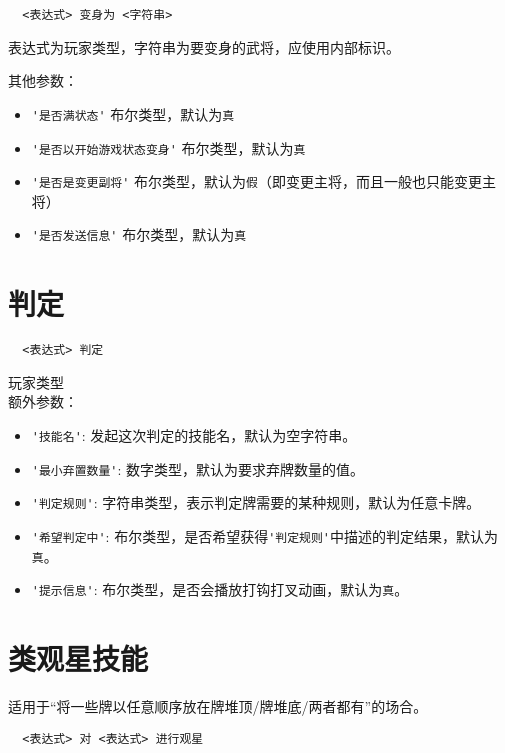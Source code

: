 \begin{verbatim}
  <表达式> 变身为 <字符串>
\end{verbatim}

表达式为玩家类型，字符串为要变身的武将，应使用内部标识。

其他参数：

\begin{itemize}
  \item \verb|'是否满状态'| 布尔类型，默认为\verb|真|
  \item \verb|'是否以开始游戏状态变身'| 布尔类型，默认为\verb|真|
  \item \verb|'是否是变更副将'| 布尔类型，默认为\verb|假|（即变更主将，而且一般也只能变更主将）
  \item \verb|'是否发送信息'| 布尔类型，默认为\verb|真|
\end{itemize}

\section{判定}

\begin{verbatim}
  <表达式> 判定
\end{verbatim}

玩家类型 \\

额外参数：

\begin{itemize}
  \item \verb|'技能名'|: 发起这次判定的技能名，默认为空字符串。
  \item \verb|'最小弃置数量'|: 数字类型，默认为要求弃牌数量的值。
  \item \verb|'判定规则'|: 字符串类型，表示判定牌需要的某种规则，默认为任意卡牌。
  \item \verb|'希望判定中'|: 布尔类型，是否希望获得\verb|'判定规则'|中描述的判定结果，默认为\verb|真|。
  \item \verb|'提示信息'|: 布尔类型，是否会播放打钩打叉动画，默认为\verb|真|。
\end{itemize}

\section{类观星技能}

适用于“将一些牌以任意顺序放在牌堆顶/牌堆底/两者都有”的场合。

\begin{verbatim}
  <表达式> 对 <表达式> 进行观星
\end{verbatim}

